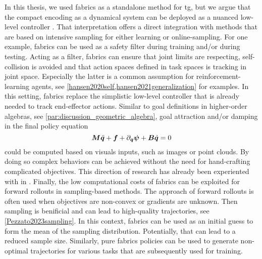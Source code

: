 In this thesis, we used \ac{fabrics} as a standalone method for \ac{tg}, but we
argue that the compact encoding as a dynamical system can be deployed as a
nuanced low-level controller \cite{ratliff2023fabrics,vanwyk2024geometric}.
That interpretation offers a direct integration with methods that are based on 
intensive sampling for either learning or online-sampling.
For one
example, \ac{fabrics} can be used as a safety filter during training and/or
during testing. Acting as a filter, \ac{fabrics} can ensure that joint limits
are respecting, self-collision is avoided and that action spaces defined in task
spaces is tracking in joint space. Especially the latter is a common assumption
for reinforcement-learning agents, see
\cref{hansen2020self,hansen2021generalization} for examples. In this setting,
\ac{fabrics} replace the simplistic low-level controller that is already
needed to track end-effector actions.
Similar to goal definitions in higher-order algebras, see
\cref{par:discussion_geometric_algebra}, goal attraction and/or damping in the final
policy equation 
\[
  \bm{M}\ddot{\bm{q}} + \bm{f} + \partial_{\bm{q}}\bm{\psi} + \bm{B}\dot{\bm{q}} = 0
\]
could be computed based on visuals inputs, such as images or point clouds. By
doing so complex behaviors can be achieved without the need for hand-crafting
complicated objectives. This direction of research has already been experiented
with in \cite{vanwyk2024geometric}.
Finally, the low computational costs of \ac{fabrics} can be exploited for
forward rollouts in sampling-based methods. The approach of forward rollouts is
often used when objectives are non-convex or gradients are unknown. Then
sampling is benificial and can lead to high-quality trajectories, see
\cref{Pezzato2023sampling}. In this context, \ac{fabrics} can be used as an
initial guess to form the mean of the sampling distribution. Potentially, that
can lead to a reduced sample size. Similarly, pure \ac{fabrics} policies can be
used to generate non-optimal trajectories for various tasks that are
subsequently used for training.

  




